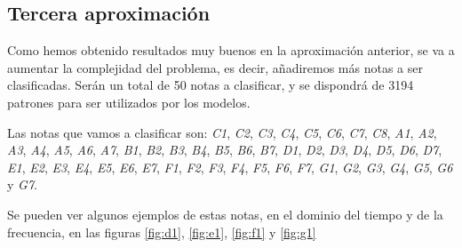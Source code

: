 \documentclass[12pt]{article}
\begin{document}
\newpage
\subsection{Tercera aproximación}
\label{Tercera aproximación}
Como hemos obtenido resultados muy buenos en la aproximación anterior, se va a aumentar la complejidad del problema,
es decir, añadiremos más notas a ser clasificadas. Serán un total de 50 notas a clasificar, y se dispondrá de 
3194 patrones para ser utilizados por los modelos.

Las notas que vamos a clasificar son: 
\textit{C1}, \textit{C2}, \textit{C3}, \textit{C4}, \textit{C5}, \textit{C6}, \textit{C7}, \textit{C8}, 
\textit{A1}, \textit{A2}, \textit{A3}, \textit{A4}, \textit{A5}, \textit{A6}, \textit{A7},
\textit{B1}, \textit{B2}, \textit{B3}, \textit{B4}, \textit{B5}, \textit{B6}, \textit{B7},
\textit{D1}, \textit{D2}, \textit{D3}, \textit{D4}, \textit{D5}, \textit{D6}, \textit{D7},
\textit{E1}, \textit{E2}, \textit{E3}, \textit{E4}, \textit{E5}, \textit{E6}, \textit{E7},
\textit{F1}, \textit{F2}, \textit{F3}, \textit{F4}, \textit{F5}, \textit{F6}, \textit{F7},
\textit{G1}, \textit{G2}, \textit{G3}, \textit{G4}, \textit{G5}, \textit{G6} y \textit{G7}.

\bigskip
Se pueden ver algunos ejemplos de estas notas, en el dominio del tiempo y de la frecuencia, en las figuras
\ref{fig:d1}, \ref{fig:e1}, \ref{fig:f1} y \ref{fig:g1}
\end{document}
